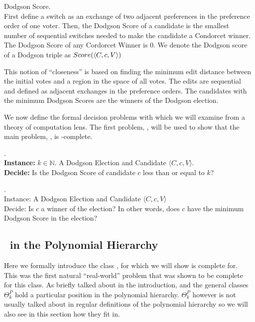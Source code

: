 \begin{defn}{Dodgson Score.}\label{def:dscore}\\
    First define a switch as an exchange of two adjacent preferences in the
    preference order of one voter.
    Then, the Dodgson Score of a candidate is the smallest number of sequential
    switches needed to make the candidate a
    Condorcet winner.
    The Dodgson Score of any Cordorcet Winner is 0.
    We denote the Dodgson score of a Dodgson triple as $Score(\langle C,c,V \rangle)$
\end{defn}

This notion of ``closeness'' is based on finding the minimum edit distance
between the initial votes and a region in the space of all votes.
The edits are sequential and defined as adjacent exchanges in the preference orders.
The candidates with the minimum Dodgson Scores are the winners of the
Dodgson election.

We now define the formal decision problems with which we will examine from a
theory of computation lens.
The first problem, \dscore, will be used to show that the main problem,
\dwin, is \tp-complete.

\begin{problem}{.} \\
    \tab \textbf{Instance:} $k \in \mathbb{N}$.
        A Dodgson Election and Candidate $\langle C,c,V \rangle$. \\
    \tab \textbf{Decide:} Is the Dodgson Score of candidate $c$ less than or
        equal to $k$?
\end{problem}

\begin{problem}{.} \\
    \tab Instance: A Dodgson Election and Candidate $\langle C,c,V \rangle$ \\
    \tab Decide: Is $c$ a winner of the election?
    In other words, does $c$ have the minimum Dodgson Score in the election?

\end{problem}


\subsection{\tp~in the Polynomial Hierarchy}

Here we formally introduce the class \tp, for which
we will show \dwin is complete for.
This was the first natural ``real-world'' problem that was shown to be complete
for this class.
As briefly talked about in the introduction, \tp and the
general classes $\Theta_{k}^P$ hold a particular position
in the polynomial hierarchy.
$\Theta_{k}^P$ however is not usually talked about in regular definitions of
the polynomial hierarchy so we will also see in this section how they fit in.

